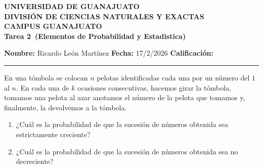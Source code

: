 \documentclass[12pt,a4paper]{article}
\newcommand{\alumno}{Ricardo León Martínez}
\newcommand{\materia}{Elementos de Probabilidad y Estadistica}
\newcommand{\tarea}{Tarea 2}
\newcommand{\fecha}{17/2/2026}
\begin{document}
    \begin{center}
        {\large\textbf{UNIVERSIDAD DE GUANAJUATO}}\\[0.3cm]
        {\normalsize\textbf{DIVISIÓN DE CIENCIAS NATURALES Y EXACTAS}}\\
        {\normalsize\textbf{CAMPUS GUANAJUATO}}\\[1cm]

        {\Large\textbf{\tarea\ (\materia)}}\\[1cm]
    \end{center}

    \noindent
    \textbf{Nombre:} \alumno 
    \hfill 
    \textbf{Fecha:} \fecha 
    \hfill 
    \textbf{Calificación:} \rule{3cm}{0.4pt}

    \vspace{0.3cm}

    \begin{mdframed}[style=mdbluebox,frametitle={Ejercicio 1}]
        En una tómbola se colocan $n$ pelotas identificadas cada una por un número del $1$ al $n$. 
        En cada una de $k$ ocasiones consecutivas, hacemos girar la tómbola, tomamos una pelota al azar 
        anotamos el número de la pelota que tomamos y, finalmente, la devolvemos a la tómbola.
        \begin{enumerate}
            \item[(a)] ¿Cuál es la probabilidad de que la sucesión de números obtenida sea estrictamente creciente?
            \item[(b)] ¿Cuál es la probabilidad de que la sucesión de números obtenida sea no decreciente?
        \end{enumerate}
    \end{mdframed}
\end{document}
